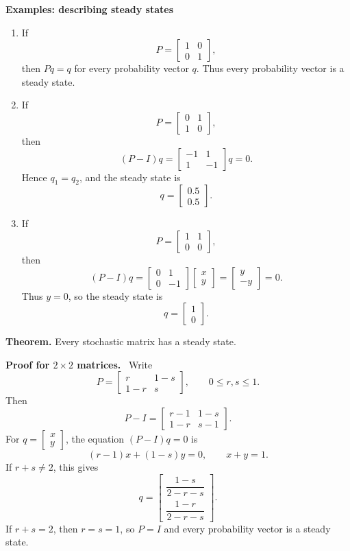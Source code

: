 \documentclass[letterpaper]{article}
\newcommand{\noteheader}[1]{\par\medskip\noindent\textbf{#1}\ }
\begin{document}
\clearpage

\textbf{Examples: describing steady states}

\begin{enumerate}
\item If
\[
P=\begin{bmatrix}1&0\\0&1\end{bmatrix},
\]
then $Pq=q$ for every probability vector $q$. Thus every probability vector is a steady state.

\item If
\[
P=\begin{bmatrix}0&1\\1&0\end{bmatrix},
\]
then
\[
(P-I)q=
\begin{bmatrix}-1&1\\1&-1\end{bmatrix}q=0.
\]
Hence $q_1=q_2$, and the steady state is
\[
q=\begin{bmatrix}0.5\\0.5\end{bmatrix}.
\]

\item If
\[
P=\begin{bmatrix}1&1\\0&0\end{bmatrix},
\]
then
\[
(P-I)q=
\begin{bmatrix}0&1\\0&-1\end{bmatrix}
\begin{bmatrix}x\\y\end{bmatrix}
=\begin{bmatrix}y\\-y\end{bmatrix}=0.
\]
Thus $y=0$, so the steady state is
\[
q=\begin{bmatrix}1\\0\end{bmatrix}.
\]
\end{enumerate}

\clearpage

\textbf{Theorem.} Every stochastic matrix has a steady state.

\noteheader{Proof for $2\times2$ matrices.} Write
\[
P=\begin{bmatrix}r&1-s\\1-r&s\end{bmatrix},
\qquad 0\leq r,s\leq1.
\]
Then
\[
P-I=
\begin{bmatrix}r-1&1-s\\1-r&s-1\end{bmatrix}.
\]
For $q=\begin{bmatrix}x\\y\end{bmatrix}$, the equation $(P-I)q=0$ is
\[
(r-1)x+(1-s)y=0,
\qquad x+y=1.
\]
If $r+s\ne2$, this gives
\[
q=
\begin{bmatrix}
\dfrac{1-s}{2-r-s}\\[6pt]
\dfrac{1-r}{2-r-s}
\end{bmatrix}.
\]
If $r+s=2$, then $r=s=1$, so $P=I$ and every probability vector is a steady state.
\end{document}
